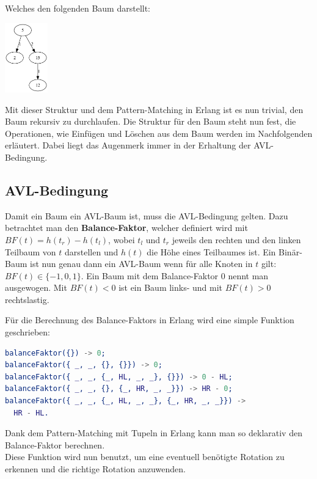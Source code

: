 \documentclass{article}
\begin{document}
   	Welches den folgenden Baum darstellt:

	\begin{center}
   	\includegraphics[height=3cm]{1.png}
	\end{center}

	Mit dieser Struktur und dem Pattern-Matching in Erlang ist es nun trivial, den Baum rekursiv zu durchlaufen. Die Struktur für den Baum steht nun fest, die Operationen, wie Einfügen und Löschen aus dem Baum werden im Nachfolgenden erläutert. Dabei liegt das Augenmerk immer in der Erhaltung der AVL-Bedingung.

	\subsection{AVL-Bedingung}
	\label{sec:avl-crit}

	Damit ein Baum ein AVL-Baum ist, muss die AVL-Bedingung gelten. Dazu betrachtet man den \textbf{Balance-Faktor}, welcher definiert wird mit \\ $BF(t) = h(t_r) - h(t_l)$, wobei $t_l$ und $t_r$ jeweils den rechten und den linken Teilbaum von $t$ darstellen und $h(t)$ die Höhe eines Teilbaumes ist.
	Ein Binär-Baum ist nun genau dann ein AVL-Baum wenn für alle Knoten in $t$ gilt: $BF(t) \in \{-1,0,1\}$. Ein Baum mit dem Balance-Faktor 0 nennt man ausgewogen. Mit $BF(t) < 0$ ist ein Baum links- und mit $BF(t) > 0$ rechtslastig.
	
	Für die Berechnung des Balance-Faktors in Erlang wird eine simple Funktion geschrieben:
	
	\begin{lstlisting}[language=erlang]
balanceFaktor({}) -> 0;
balanceFaktor({ _, _, {}, {}}) -> 0;
balanceFaktor({ _, _, {_, HL, _, _}, {}}) -> 0 - HL;
balanceFaktor({ _, _, {}, {_, HR, _, _}}) -> HR - 0;
balanceFaktor({ _, _, {_, HL, _, _}, {_, HR, _, _}}) -> 
  HR - HL.
	\end{lstlisting}
	
	Dank dem Pattern-Matching mit Tupeln in Erlang kann man so deklarativ den Balance-Faktor berechnen. \\
	Diese Funktion wird nun benutzt, um eine eventuell benötigte Rotation zu erkennen und die richtige Rotation anzuwenden.
	
\end{document}
